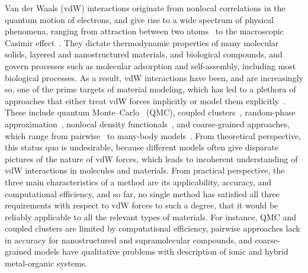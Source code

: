 Van der Waals (vdW) interactions originate from nonlocal correlations in the quantum motion of electrons, and give rise to a wide spectrum of physical phenomena, ranging from attraction between two atoms~\citep{LondonZP30} to the macroscopic Casimir effect~\citep{JaffePRD05}.
They dictate thermodynamic properties of many molecular solids, layered and nanostructured materials, and biological compounds, and govern processes such as molecular adsorption and self-assembly, including most biological processes.
As a result, vdW interactions have been, and are increasingly so, one of the prime targets of material modeling, which has led to a plethora of approaches that either treat vdW forces implicitly or model them explicitly~\citep{KlimesJCP12,GrimmeCR16,HermannCR17}.
These include quantum Monte--Carlo~\citep{AmbrosettiJPCL14} (QMC), coupled clusters~\citep{YangS14}, random-phase approximation~\citep{LuPRL09}, nonlocal density functionals~\citep{DionPRL04,VydrovPRL09}, and coarse-grained approaches, which range from pairwise~\citep{GrimmeJCC04,BeckeJCP07,TkatchenkoPRL09} to many-body models~\citep{TkatchenkoPRL12,SilvestrelliJCP13}.
From theoretical perspective, this status quo is undesirable, because different models often give disparate pictures of the nature of vdW forces, which leads to incoherent understanding of vdW interactions in molecules and materials.
From practical perspective, the three main characteristics of a method are its applicability, accuracy, and computational efficiency, and so far, no single method has satisfied all three requirements with respect to vdW forces to such a degree, that it would be reliably applicable to all the relevant types of materials.
For instance, QMC and coupled clusters are limited by computational efficiency, pairwise approaches lack in accuracy for nanostructured and supramolecular compounds, and coarse-grained models have qualitative problems with description of ionic and hybrid metal-organic systems.

